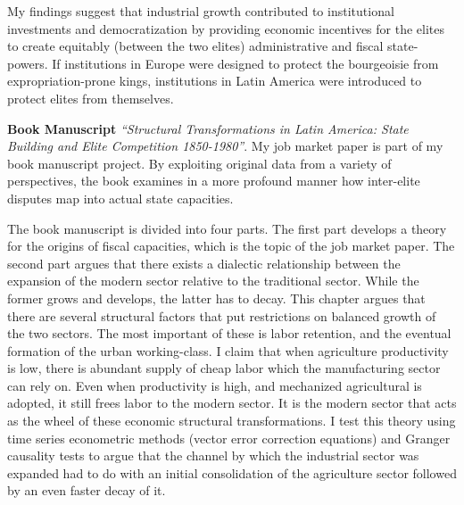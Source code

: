 \documentclass[11pt]{letter} %
\begin{document}
\begin{letter}{}
My findings suggest that industrial growth contributed to institutional investments and democratization by providing economic incentives for the elites to create equitably (between the two elites) administrative and fiscal state-powers. If institutions in Europe were designed to protect the bourgeoisie from expropriation-prone kings, institutions in Latin America were introduced to protect elites from themselves.

{\bf Book Manuscript} \emph{``Structural Transformations in Latin America: State Building and Elite Competition 1850-1980''}. My job market paper is part of my book manuscript project. By exploiting original data from a variety of perspectives, the book examines in a more profound manner how inter-elite disputes map into actual state capacities.

The book manuscript is divided into four parts. The first part develops a theory for the origins of fiscal capacities, which is the topic of the job market paper. The second part argues that there exists a dialectic relationship between the expansion of the modern sector relative to the traditional sector. While the former grows and develops, the latter has to decay. This chapter argues that there are several structural factors that put restrictions on balanced growth of the two sectors. The most important of these is labor retention, and the eventual formation of the urban working-class. I claim that when agriculture productivity is low, there is abundant supply of cheap labor which the manufacturing sector can rely on. Even when productivity is high, and mechanized agricultural is adopted, it still frees labor to the modern sector. It is the modern sector that acts as the wheel of these economic structural transformations. I test this theory using time series econometric methods (vector error correction equations) and Granger causality tests to argue that the channel by which the industrial sector was expanded had to do with an initial consolidation of the agriculture sector followed by an even faster decay of it. 


\end{letter}
\end{document}
